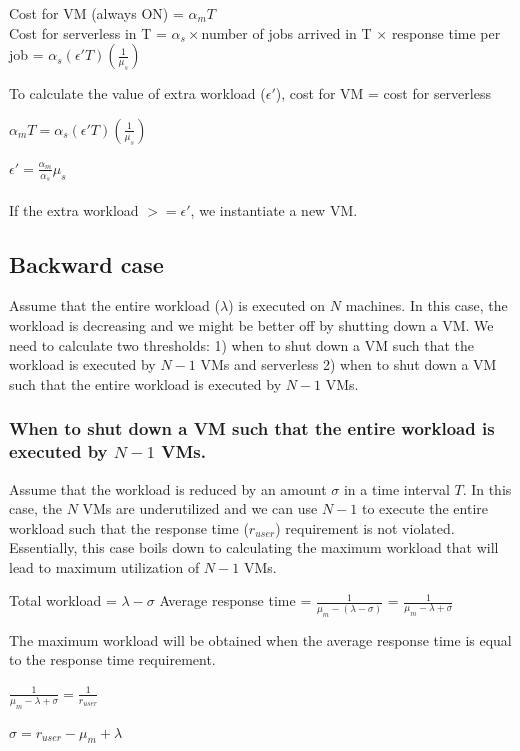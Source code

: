 \documentclass[letter,11pt]{article}
\begin{document}
Cost for VM (always ON)  = $\alpha_m T$ \\

Cost for serverless in T = $\alpha_s \times $number of jobs arrived in T $\times$ response time per job = $\alpha_s (\epsilon' T) (\frac{1}{\mu_s})$ 

To calculate the value of extra workload ($\epsilon'$), cost for VM = cost for serverless

$\alpha_m T = \alpha_s (\epsilon' T) (\frac{1}{\mu_s})$ 

$\epsilon' =  \frac{\alpha_m}{\alpha_s} \mu_s$ \\ \\
If the extra workload $>= \epsilon'$, we instantiate a new VM.

\subsection{Backward case}

Assume that the entire workload ($\lambda$) is executed on $N$ machines. In this case, the workload is decreasing and we might be better off by shutting down a VM. We need to calculate two thresholds: 1) when to shut down a VM such that the workload is executed by $N-1$ VMs and serverless 2) when to shut down a VM such that the entire workload is executed by $N-1$ VMs.

\subsubsection{When to shut down a VM such that the entire workload is executed by $N-1$ VMs.}

Assume that the workload is reduced by an amount $\sigma$ in a time interval $T$. In this case, the $N$ VMs are underutilized and we can use $N-1$ to execute the entire workload such that the response time ($r_{user}$) requirement is not violated. Essentially, this case boils down to calculating the maximum workload that will lead to maximum utilization of $N-1$ VMs.

Total workload = $\lambda - \sigma$
Average response time = $\frac{1}{\mu_m - (\lambda - \sigma)}$ = $\frac{1}{\mu_m - \lambda + \sigma}$ 

The maximum workload will be obtained when the average response time is equal to the response time requirement.

$\frac{1}{\mu_m - \lambda + \sigma} = \frac{1}{r_{user}}$ 

$\sigma = r_{user} - \mu_m + \lambda$
\end{document}
